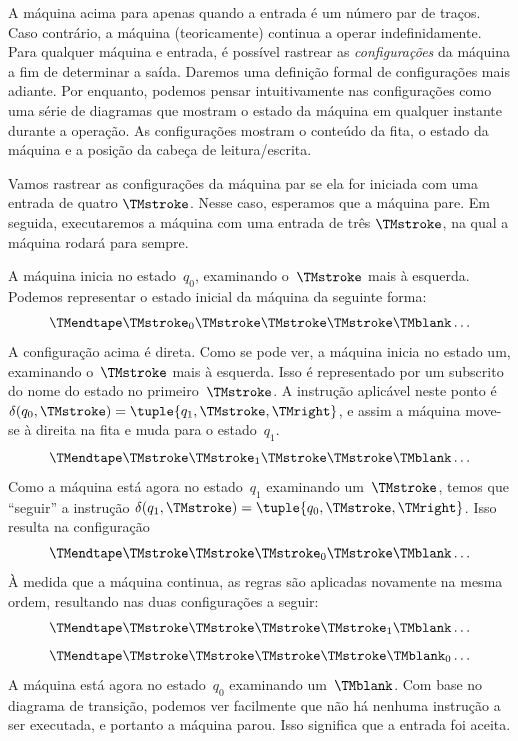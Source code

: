 \documentclass[../../../include/open-logic-section]{subfiles}
\begin{document}
\begin{explain}
A máquina acima para apenas quando a entrada é um número par de traços.
Caso contrário, a máquina (teoricamente) continua a operar indefinidamente. 
Para qualquer máquina e entrada, é possível rastrear as 
\emph{configurações} da máquina a fim de determinar a saída. 
Daremos uma definição formal de configurações mais adiante. Por enquanto,
podemos pensar intuitivamente nas configurações como uma série de diagramas que mostram o 
estado da máquina em qualquer instante durante a operação.
As configurações mostram o conteúdo da fita, o estado da máquina e a
posição da cabeça de leitura/escrita.

Vamos rastrear as configurações da máquina par se ela for
iniciada com uma entrada de quatro $\TMstroke$. Nesse caso, esperamos que a
máquina pare.  Em seguida, executaremos a máquina com uma entrada de três
$\TMstroke$, na qual a máquina rodará para sempre.

A máquina inicia no estado~$q_0$, examinando o~$\TMstroke$ mais à esquerda.
Podemos representar o estado inicial da máquina da seguinte forma:
\[
\TMendtape \TMstroke_0 \TMstroke \TMstroke \TMstroke \TMblank \ldots
\]
A configuração acima é direta. Como se pode ver, a
máquina inicia no estado um, examinando o~$\TMstroke$ mais à esquerda. Isso
é representado por um subscrito do nome do estado no
primeiro~$\TMstroke$. A instrução aplicável neste ponto é
$\delta(q_0, \TMstroke) = \tuple{q_1, \TMstroke, \TMright}$, e assim
a máquina move-se à direita na fita e muda para o estado~$q_1$.
\[
\TMendtape \TMstroke \TMstroke_1 \TMstroke \TMstroke \TMblank \ldots
\]
Como a máquina está agora no estado~$q_1$ examinando um~$\TMstroke$, temos que
``seguir'' a instrução $\delta(q_1, \TMstroke) = \tuple{q_0,
  \TMstroke, \TMright}$. Isso resulta na configuração
\[
\TMendtape \TMstroke \TMstroke \TMstroke_0 \TMstroke \TMblank \ldots
\]
À medida que a máquina continua, as regras são aplicadas novamente na mesma
ordem, resultando nas duas configurações a seguir:
\[
\TMendtape \TMstroke \TMstroke \TMstroke \TMstroke_1 \TMblank \ldots
\]
\[
\TMendtape \TMstroke \TMstroke \TMstroke \TMstroke \TMblank_0 \ldots
\]
A máquina está agora no estado~$q_0$ examinando um~$\TMblank$. Com base no
diagrama de transição, podemos ver facilmente que não há nenhuma instrução a ser
executada, e portanto a máquina parou. Isso significa que a entrada
foi aceita.


\end{explain}
\end{document}
